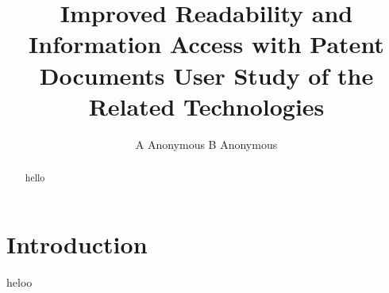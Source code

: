 \documentclass[11pt]{article}
\title{Improved Readability and Information Access with Patent Documents User Study of the Related Technologies}
\author{A Anonymous 
\And
  B Anonymous
}
\date{}
\begin{document}
\maketitle

\begin{abstract}   
hello
\end{abstract}


\section{Introduction}
heloo
\end{document}
